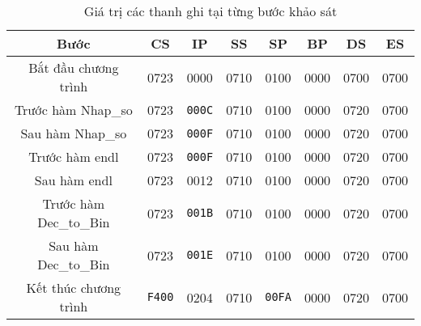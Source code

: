 \begin{table}[H]
    \centering
    \caption{Giá trị các thanh ghi tại từng bước khảo sát}
    \begin{tabular}{|c|c|c|c|c|c|c|c|}
        \hline
        Bước & CS & IP & SS & SP & BP & DS & ES \\ \hline
        Bắt đầu chương trình & 0723 & 0000 & 0710 & 0100 & 0000 & 0700 & 0700 \\ \hline
        Trước hàm Nhap\_so & 0723 & \texttt{000C} & 0710 & 0100 & 0000 & 0720 & 0700 \\ \hline
        Sau hàm Nhap\_so & 0723 & \texttt{000F} & 0710 & 0100 & 0000 & 0720 & 0700 \\ \hline
        Trước hàm endl & 0723 & \texttt{000F} & 0710 & 0100 & 0000 & 0720 & 0700 \\ \hline
        Sau hàm endl & 0723 & 0012 & 0710 & 0100 & 0000 & 0720 & 0700 \\ \hline
        Trước hàm Dec\_to\_Bin & 0723 & \texttt{001B} & 0710 & 0100 & 0000 & 0720 & 0700 \\ \hline
        Sau hàm Dec\_to\_Bin & 0723 & \texttt{001E} & 0710 & 0100 & 0000 & 0720 & 0700 \\ \hline
        Kết thúc chương trình & \texttt{F400} & 0204 & 0710 & \texttt{00FA} & 0000 & 0720 & 0700 \\ \hline
    \end{tabular}
\end{table}

